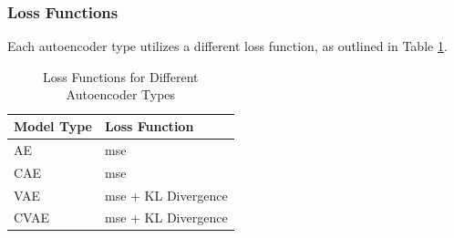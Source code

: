 \subsubsection{Loss Functions}

Each autoencoder type utilizes a different loss function, as outlined in Table \ref{tab:loss_functions}.

\begin{table}[!htbp]
    \centering
    \begin{tabular}{ll}
        \hline
        \textbf{Model Type} & \textbf{Loss Function} \\
        \hline
        AE & \acrshort{mse} \\
        CAE & \acrshort{mse} \\
        VAE & \acrshort{mse} + KL Divergence \\
        CVAE & \acrshort{mse} + KL Divergence \\
        \hline
    \end{tabular}
    \caption{Loss Functions for Different Autoencoder Types}
    \label{tab:loss_functions}
\end{table}

